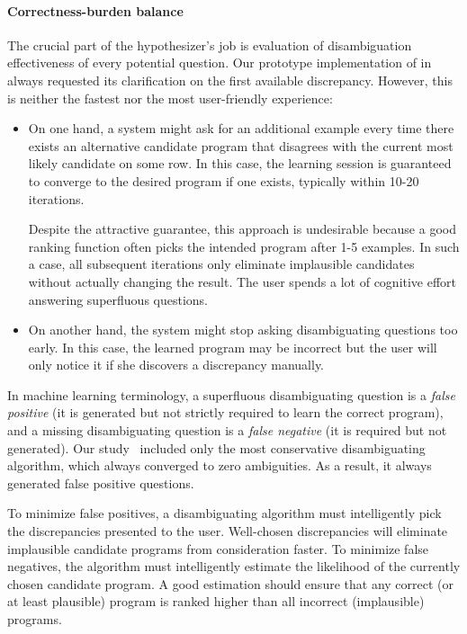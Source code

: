 \paragraph{Correctness-burden balance}
The crucial part of the hypothesizer's job is evaluation of disambiguation effectiveness of every potential question.
Our prototype implementation of \ConversationalClarification in \FlashProg always requested its clarification on the
first available discrepancy.
However, this is neither the fastest nor the most user-friendly experience:
\begin{itemize}
    \item On one hand, a system might ask for an additional example every time there exists an alternative candidate
        program that disagrees with the current most likely candidate on some row.
        In this case, the learning session is guaranteed to converge to the desired program if one exists, typically
        within 10-20 iterations.

        Despite the attractive guarantee, this approach is undesirable because a good ranking function often picks the
        intended program after 1-5 examples.
        In such a case, all subsequent iterations only eliminate implausible candidates without actually changing the
        result.
        The user spends a lot of cognitive effort answering superfluous questions.

    \item On another hand, the system might stop asking disambiguating questions too early.
        In this case, the learned program may be incorrect but the user will only notice it if she discovers a
        discrepancy manually.
\end{itemize}
In machine learning terminology, a superfluous disambiguating question is a \emph{false positive} (it is generated but
not strictly required to learn the correct program), and a missing disambiguating question is a \emph{false negative}
(it is required but not generated).
Our \FlashProg study~\cite{flashprog} included only the most conservative disambiguating algorithm, which always
converged to zero ambiguities.
As a result, it always generated false positive questions.

To minimize false positives, a disambiguating algorithm must intelligently pick the discrepancies presented to the user.
Well-chosen discrepancies will eliminate implausible candidate programs from consideration faster.
To minimize false negatives, the algorithm must intelligently estimate the likelihood of the currently chosen candidate
program.
A good estimation should ensure that any correct (or at least plausible) program is ranked higher than all incorrect
(implausible) programs.

